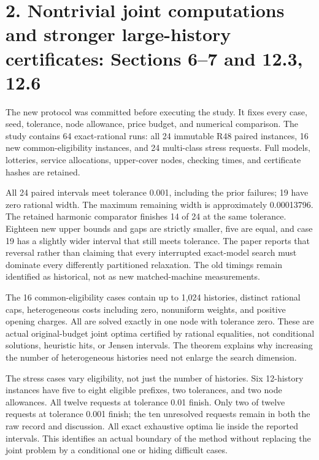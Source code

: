 \documentclass[11pt,letterpaper]{article}
\begin{document}
\section*{2. Nontrivial joint computations and stronger large-history certificates: Sections 6–7 and 12.3, 12.6}


The new protocol was committed before executing the study. It fixes every case, seed, tolerance, node allowance, price budget, and numerical comparison. The study contains 64 exact-rational runs: all 24 immutable R48 paired instances, 16 new common-eligibility instances, and 24 multi-class stress requests. Full models, lotteries, service allocations, upper-cover nodes, checking times, and certificate hashes are retained.



All 24 paired intervals meet tolerance 0.001, including the prior failures; 19 have zero rational width. The maximum remaining width is approximately 0.00013796. The retained harmonic comparator finishes 14 of 24 at the same tolerance. Eighteen new upper bounds and gaps are strictly smaller, five are equal, and case 19 has a slightly wider interval that still meets tolerance. The paper reports that reversal rather than claiming that every interrupted exact-model search must dominate every differently partitioned relaxation. The old timings remain identified as historical, not as new matched-machine measurements.



The 16 common-eligibility cases contain up to 1,024 histories, distinct rational caps, heterogeneous costs including zero, nonuniform weights, and positive opening charges. All are solved exactly in one node with tolerance zero. These are actual original-budget joint optima certified by rational equalities, not conditional solutions, heuristic hits, or Jensen intervals. The theorem explains why increasing the number of heterogeneous histories need not enlarge the search dimension.



The stress cases vary eligibility, not just the number of histories. Six 12-history instances have five to eight eligible prefixes, two tolerances, and two node allowances. All twelve requests at tolerance 0.01 finish. Only two of twelve requests at tolerance 0.001 finish; the ten unresolved requests remain in both the raw record and discussion. All exact exhaustive optima lie inside the reported intervals. This identifies an actual boundary of the method without replacing the joint problem by a conditional one or hiding difficult cases.
\end{document}

